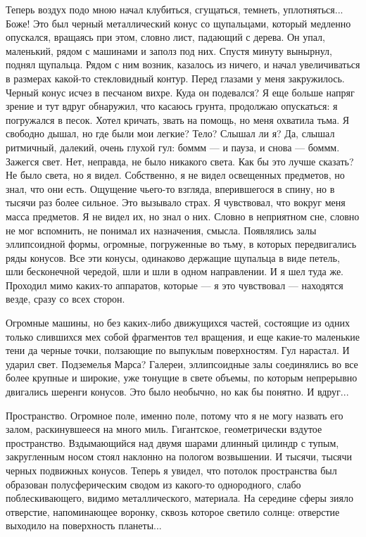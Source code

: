 Теперь  воздух  подо  мною   начал   клубиться,   сгущаться,   темнеть,
уплотняться... Боже! Это был черный  металлический  конус  со  щупальцами,
который медленно опускался, вращаясь при этом,  словно  лист,  падающий  с
дерева. Он упал, маленький, рядом с машинами  и  заполз  под  них.  Спустя
минуту вынырнул, поднял щупальца. Рядом с ним возник, казалось из  ничего,
и начал увеличиваться  в  размерах  какой-то  стекловидный  контур.  Перед
глазами у меня закружилось. Черный конус исчез в песчаном вихре.  Куда  он
подевался? Я еще больше напряг зрение и тут вдруг обнаружил,  что  касаюсь
грунта, продолжаю опускаться: я погружался в песок. Хотел  кричать,  звать
на помощь, но меня охватила тьма.  Я  свободно  дышал,  но  где  были  мои
легкие? Тело? Слышал ли я? Да, слышал  ритмичный,  далекий,  очень  глухой
гул: боммм --- и пауза, и снова --- боммм. Зажегся  свет.  Нет,  неправда,  не
было никакого света. Как бы это лучше сказать? Не было света, но я  видел.
Собственно, я не видел  освещенных  предметов,  но  знал,  что  они  есть.
Ощущение чьего-то взгляда, вперившегося в спину, но  в  тысячи  раз  более
сильное.  Это  вызывало  страх.  Я  чувствовал,  что  вокруг  меня   масса
предметов. Я не видел их, но знал о них. Словно в неприятном  сне,  словно
не мог вспомнить,  не  понимал  их  назначения,  смысла.  Появлялись  залы
эллипсоидной формы, огромные, погруженные во тьму, в которых передвигались
ряды конусов. Все эти конусы, одинаково держащие щупальца в  виде  петель,
шли бесконечной чередой, шли и шли в одном направлении. И я шел  туда  же.
Проходил мимо каких-то аппаратов, которые --- я это чувствовал  ---  находятся
везде, сразу со всех сторон.

Огромные машины, но без  каких-либо  движущихся  частей,  состоящие  из
одних только слившихся мех собой фрагментов тел вращения, и  еще  какие-то
маленькие тени да черные точки, ползающие по  выпуклым  поверхностям.  Гул
нарастал. И ударил свет.  Подземелья  Марса?  Галереи,  эллипсоидные  залы
соединялись во все более крупные и широкие, уже тонущие в свете объемы, по
которым непрерывно двигались шеренги конусов. Это было необычно, но как бы
понятно. И вдруг...

Пространство. Огромное поле, именно поле, потому что я не могу  назвать
его залом, раскинувшееся на много миль. Гигантское, геометрически  вздутое
пространство. Вздымающийся над  двумя  шарами  длинный  цилиндр  с  тупым,
закругленным носом стоял наклонно на пологом возвышении. И тысячи,  тысячи
черных подвижных конусов. Теперь я увидел, что  потолок  пространства  был
образован  полусферическим  сводом   из   какого-то   однородного,   слабо
поблескивающего, видимо металлического, материала. На середине сферы зияло
отверстие, напоминающее воронку, сквозь которое светило солнце:  отверстие
выходило на поверхность планеты...

